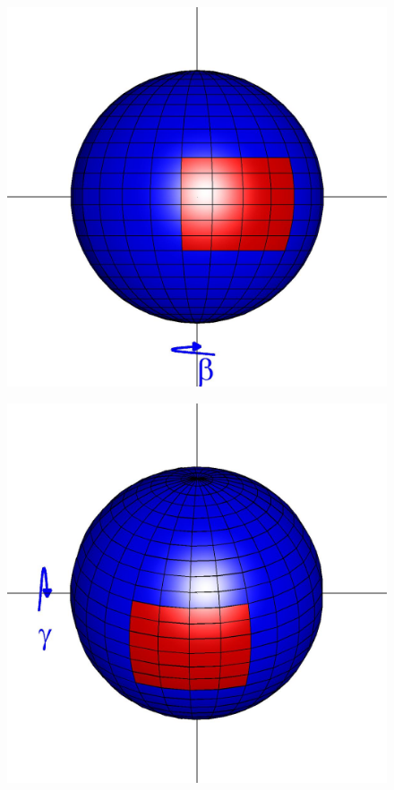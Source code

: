 \documentclass{pnastwo}
\begin{document}
\begin{figure}
\begin{minipage}{0.22\textwidth}
\end{minipage}
\begin{minipage}{0.22\textwidth}
\centering
\includegraphics[width=\textwidth]{sphere2_3}\\
\end{minipage}
\begin{minipage}{0.22\textwidth} 
\centering
\includegraphics[width=\textwidth]{sphere2_4}\\

\end{minipage}
\end{figure}
\end{document}
